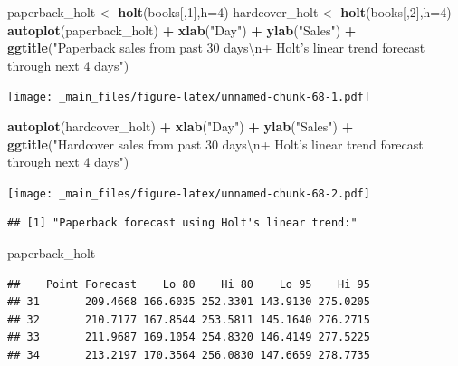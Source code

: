 \documentclass[]{book}
\newenvironment{Shaded}{\begin{snugshade}}{\end{snugshade}}
\newcommand{\CharTok}[1]{\textcolor[rgb]{0.31,0.60,0.02}{#1}}
\newcommand{\DataTypeTok}[1]{\textcolor[rgb]{0.13,0.29,0.53}{#1}}
\newcommand{\DecValTok}[1]{\textcolor[rgb]{0.00,0.00,0.81}{#1}}
\newcommand{\KeywordTok}[1]{\textcolor[rgb]{0.13,0.29,0.53}{\textbf{#1}}}
\newcommand{\NormalTok}[1]{#1}
\newcommand{\OperatorTok}[1]{\textcolor[rgb]{0.81,0.36,0.00}{\textbf{#1}}}
\newcommand{\StringTok}[1]{\textcolor[rgb]{0.31,0.60,0.02}{#1}}
\begin{document}
\begin{Shaded}
\begin{Highlighting}[]
\NormalTok{paperback_holt <-}\StringTok{ }\KeywordTok{holt}\NormalTok{(books[,}\DecValTok{1}\NormalTok{],}\DataTypeTok{h=}\DecValTok{4}\NormalTok{)}
\NormalTok{hardcover_holt <-}\StringTok{ }\KeywordTok{holt}\NormalTok{(books[,}\DecValTok{2}\NormalTok{],}\DataTypeTok{h=}\DecValTok{4}\NormalTok{)}
\KeywordTok{autoplot}\NormalTok{(paperback_holt) }\OperatorTok{+}
\KeywordTok{xlab}\NormalTok{(}\StringTok{"Day"}\NormalTok{) }\OperatorTok{+}\StringTok{ }\KeywordTok{ylab}\NormalTok{(}\StringTok{"Sales"}\NormalTok{) }\OperatorTok{+}\StringTok{ }
\KeywordTok{ggtitle}\NormalTok{(}\StringTok{"Paperback sales from past 30 days}\CharTok{\textbackslash{}n}\StringTok{+ Holt's linear trend forecast through next 4 days"}\NormalTok{)}
\end{Highlighting}
\end{Shaded}

\texttt{[image: \_main\_files/figure-latex/unnamed-chunk-68-1.pdf]}

\begin{Shaded}
\begin{Highlighting}[]
\KeywordTok{autoplot}\NormalTok{(hardcover_holt) }\OperatorTok{+}
\KeywordTok{xlab}\NormalTok{(}\StringTok{"Day"}\NormalTok{) }\OperatorTok{+}\StringTok{ }\KeywordTok{ylab}\NormalTok{(}\StringTok{"Sales"}\NormalTok{) }\OperatorTok{+}\StringTok{ }
\KeywordTok{ggtitle}\NormalTok{(}\StringTok{"Hardcover sales from past 30 days}\CharTok{\textbackslash{}n}\StringTok{+ Holt's linear trend forecast through next 4 days"}\NormalTok{)}
\end{Highlighting}
\end{Shaded}

\texttt{[image: \_main\_files/figure-latex/unnamed-chunk-68-2.pdf]}

\begin{verbatim}
## [1] "Paperback forecast using Holt's linear trend:"
\end{verbatim}

\begin{Shaded}
\begin{Highlighting}[]
\NormalTok{paperback_holt}
\end{Highlighting}
\end{Shaded}

\begin{verbatim}
##    Point Forecast    Lo 80    Hi 80    Lo 95    Hi 95
## 31       209.4668 166.6035 252.3301 143.9130 275.0205
## 32       210.7177 167.8544 253.5811 145.1640 276.2715
## 33       211.9687 169.1054 254.8320 146.4149 277.5225
## 34       213.2197 170.3564 256.0830 147.6659 278.7735
\end{verbatim}
\end{document}
